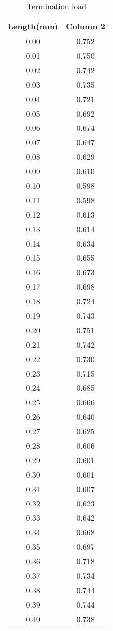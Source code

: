 \documentclass{report}
\begin{document}
    \begin{table}[H]
        \centering
        \begin{tabular}{cc}
        \hline
        Length(mm) & Column 2 \\
        \hline
        0.00 & 0.752 \\
        0.01 & 0.750 \\
        0.02 & 0.742 \\
        0.03 & 0.735 \\
        0.04 & 0.721 \\
        0.05 & 0.692 \\
        0.06 & 0.674 \\
        0.07 & 0.647 \\
        0.08 & 0.629 \\
        0.09 & 0.610 \\
        0.10 & 0.598 \\
        0.11 & 0.598 \\
        0.12 & 0.613 \\
        0.13 & 0.614 \\
        0.14 & 0.634 \\
        0.15 & 0.655 \\
        0.16 & 0.673 \\
        0.17 & 0.698 \\
        0.18 & 0.724 \\
        0.19 & 0.743 \\
        0.20 & 0.751 \\
        0.21 & 0.742 \\
        0.22 & 0.730 \\
        0.23 & 0.715 \\
        0.24 & 0.685 \\
        0.25 & 0.666 \\
        0.26 & 0.640 \\
        0.27 & 0.625 \\
        0.28 & 0.606 \\
        0.29 & 0.601 \\
        0.30 & 0.601 \\
        0.31 & 0.607 \\
        0.32 & 0.623 \\
        0.33 & 0.642 \\
        0.34 & 0.668 \\
        0.35 & 0.697 \\
        0.36 & 0.718 \\
        0.37 & 0.734 \\
        0.38 & 0.744 \\
        0.39 & 0.744 \\
        0.40 & 0.738 \\
        \hline
        \end{tabular}
        \caption{Termination load}
    \end{table}
\end{document}
